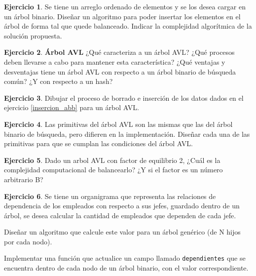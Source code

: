 \documentclass[11pt,a4paper]{article}
\theoremstyle{definition}
\newtheorem{ejercicio}{Ejercicio}[section]
\begin{document}
\begin{ejercicio}
Se tiene un arreglo ordenado de elementos y se los desea cargar en un
árbol binario.  Diseñar un algoritmo para poder insertar los elementos en
el árbol de forma tal que quede balanceado. Indicar la complejidad
algorítmica de la solución propuesta.
\end{ejercicio}

\begin{ejercicio}
\textbf{Árbol AVL}
¿Qué caracteriza a un árbol AVL? ¿Qué procesos deben llevarse a cabo para
mantener esta característica? ¿Qué ventajas y desventajas tiene un árbol
AVL con respecto a un árbol binario de búsqueda común? ¿Y con respecto a un
hash?
\end{ejercicio}

\begin{ejercicio}
Dibujar el proceso de borrado e inserción de los datos dados en el
ejercicio \ref{insercion_abb} para un árbol AVL.
\end{ejercicio}

\begin{ejercicio}
Las primitivas del árbol AVL son las mismas que las del árbol binario de
búsqueda, pero difieren en la implementación.  Diseñar cada una de las
primitivas para que se cumplan las condiciones del árbol AVL.
\end{ejercicio}

\begin{ejercicio}
Dado un arbol AVL con factor de equilibrio 2, ¿Cuál es la complejidad
computacional de balancearlo? ¿Y si el factor es un número arbitrario B?
\end{ejercicio}

\begin{ejercicio}
Se tiene un organigrama que representa las relaciones de dependencia de los
empleados con respecto a sus jefes, guardado dentro de un árbol, se desea
calcular la cantidad de empleados que dependen de cada jefe.
\begin{partes}
\item Diseñar un algoritmo que calcule este valor para un árbol genérico (de N
hijos por cada nodo).
\item Implementar una función que actualice un campo llamado
\lstinline!dependientes! que se encuentra dentro de cada nodo de un árbol
binario, con el valor correspondiente.
\end{partes}
\end{ejercicio}
\end{document}
